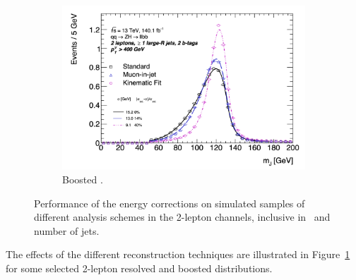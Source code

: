 \begin{figure}[h!]
\begin{subfigure}[b]{0.49\textwidth}
    \includegraphics[width=\textwidth]{Images/VH/Correct/CorrectedDist/bbB.png}
    \caption{Boosted \vhb.}
  \end{subfigure}
  \caption{Performance of the energy corrections on simulated samples of different analysis schemes in the 2-lepton channels, inclusive in \ptv\ and number of jets.}
  \label{fig:CorrResults}
\end{figure} 
The effects of the different reconstruction techniques are illustrated in Figure~\ref{fig:CorrResults} for some selected 2-lepton resolved and boosted distributions. 
